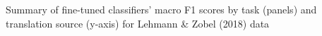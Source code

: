 Summary of fine-tuned classifiers' macro F1 scores by task (panels) and translation source (y-axis) for Lehmann \& Zobel (2018) data \label{fig:f1_scores_lehmann+zobel_2018}
